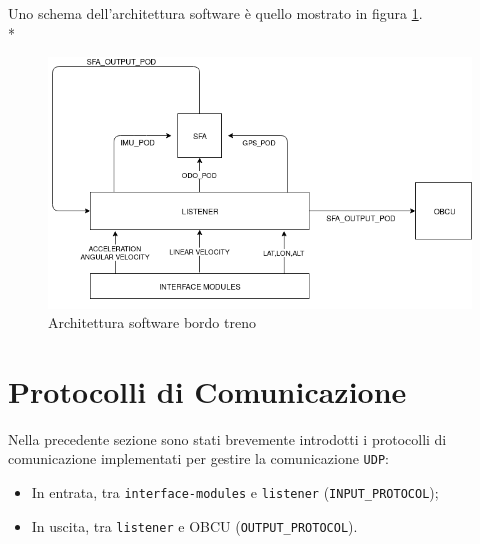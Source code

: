 Uno schema dell'architettura software \`e quello mostrato in figura \ref{fig:tdiagramint}.\\*
\begin{figure}[h]
	\centering
	\includegraphics[width=\linewidth]{img/InternalTrainSchema}
	\caption{Architettura software bordo treno}
	\label{fig:tdiagramint}
\end{figure}
\section{Protocolli di Comunicazione}
Nella precedente sezione sono stati brevemente introdotti i protocolli di comunicazione implementati per gestire la comunicazione \texttt{UDP}:
\begin{itemize}
	\item In entrata, tra \texttt{interface-modules} e \texttt{listener} (\texttt{INPUT\_PROTOCOL});
	\item In uscita, tra \texttt{listener} e OBCU (\texttt{OUTPUT\_PROTOCOL}).
\end{itemize}

